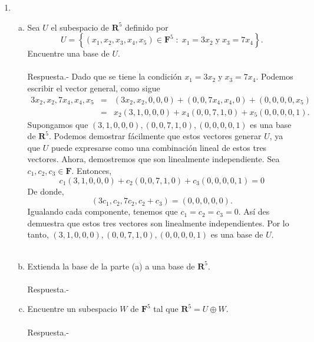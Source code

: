 \begin{enumerate}[\bfseries 1.]
\begin{enumerate}[(a)]
	\end{enumerate}

    \item 
	\begin{enumerate}[a).]

	    \item Sea $U$ el subespacio de $\textbf{R}^5$ definido por
	    $$U=\left\{(x_1,x_2,x_3,x_4,x_5)\in \textbf{F}^5\; : \; x_1=3x_2\;\mbox{y}\; x_3=7x_4\right\}.$$
	    Encuentre una base de $U$.\\\\
		Respuesta.-\; Dado que se tiene la condición $x_1=3x_2\;\mbox{y}\; x_3=7x_4$. Podemos escribir el vector general, como sigue
		$$
		\begin{array}{rcl}
		    3x_2,x_2,7x_4,x_4,x_5 &=& (3x_2,x_2,0,0,0)+(0,0,7x_4,x_4,0)+(0,0,0,0,x_5)\\
					  &=& x_2(3,1,0,0,0)+x_4(0,0,7,1,0)+x_5(0,0,0,0,1).
		\end{array}
		$$
		Supongamos que $(3,1,0,0,0),(0,0,7,1,0),(0,0,0,0,1)$ es una base de $\textbf{R}^5$. Podemos demostrar fácilmente que estos vectores generar $U$, ya que $U$ puede expresarse como una combinación lineal de estos tres vectores. Ahora, demostremos que son linealmente independiente. Sea $c_1,c_2,c_3\in \textbf{F}$. Entonces, 
		$$c_1(3,1,0,0,0)+c_2(0,0,7,1,0)+c_3(0,0,0,0,1)=0$$
		De donde,
		$$(3c_1,c_2,7c_2,c_2+c_3)=(0,0,0,0,0).$$
		Igualando cada componente, tenemos que $c_1=c_2=c_3=0$. Así des demuestra que estos tres vectores son linealmente independientes. Por lo tanto, $(3,1,0,0,0),(0,0,7,1,0),(0,0,0,0,1)$ es una base de $U$.\\\\

	    \item Extienda la base de la parte (a) a una base de $\textbf{R}^5$.\\\\
		Respuesta.-\; 

	    \item Encuentre un subespacio $W$ de $\textbf{F}^5$ tal que $\textbf{R}^5=U\oplus W$.\\\\
		Respuesta.- 

	\end{enumerate}

\end{enumerate}
